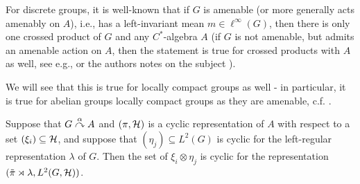 For discrete groups, it is well-known that if $G$ is amenable (or more generally acts amenably on $A$), i.e., has a left-invariant mean $m \in \ell^\infty(G)$, then there is only one crossed product of $G$ and any $C^*$-algebra $A$ (if $G$ is not amenable, but admits an amenable action on $A$, then the statement is true for crossed products with $A$ as well, see e.g., \cite[4.3.4]{brown2008c} or the authors notes on the subject \cite[Part 2, pg. 26, 32]{approxtalk}).

We will see that this is true for locally compact groups as well - in particular, it is true for abelian groups locally compact groups as they are amenable, c.f. \cite[appendix G]{bekka2008kazhdan}.

\begin{lemma}
Suppose that $G \stackrel{\alpha}{\curvearrowright} A$ and $(\pi,\mathcal{H})$ is a cyclic representation of $A$ with respect to a set $(\xi_i) \subseteq \mathcal{H}$, and suppose that $(\eta_j) \subseteq L^2(G)$ is cyclic for the left-regular representation $\lambda$ of $G$. Then the set of $\xi_i \otimes \eta_j$ is cyclic for the representation $(\tilde \pi \rtimes \lambda, L^2(G,\mathcal{H}))$.
\label{mult:cyclic1}
\end{lemma}
